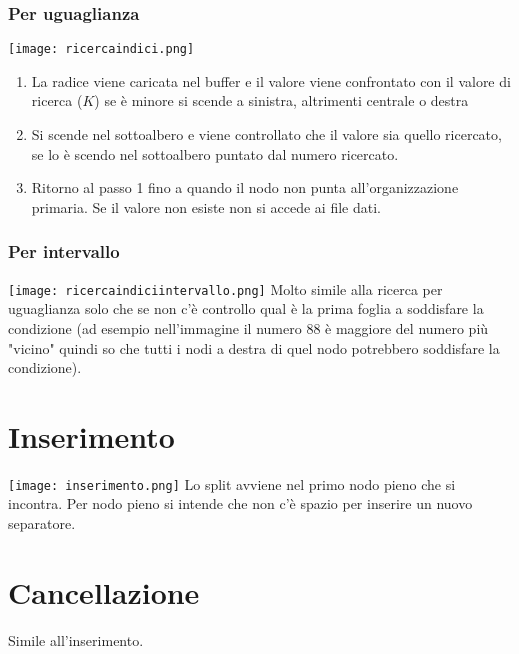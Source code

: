 \documentclass[12pt]{article}
\begin{document}
\subsubsection{Per uguaglianza}
\texttt{[image: ricercaindici.png]}
\begin{enumerate}
    \item La radice viene caricata nel buffer e il valore viene confrontato con il valore di ricerca ($K$) se è minore si scende a sinistra, altrimenti centrale o destra
    \item Si scende nel sottoalbero e viene controllato che il valore sia quello ricercato, se lo è scendo nel sottoalbero puntato dal numero ricercato.
    \item Ritorno al passo 1 fino a quando il nodo non punta all'organizzazione primaria. Se il valore non esiste non si accede ai file dati.
\end{enumerate}
\subsubsection{Per intervallo}
\texttt{[image: ricercaindiciintervallo.png]}
Molto simile alla ricerca per uguaglianza solo che se non c'è controllo qual è la prima foglia a soddisfare la condizione (ad esempio nell'immagine il numero 88 è maggiore del numero più "vicino" quindi so che tutti i nodi a destra di quel nodo potrebbero soddisfare la condizione).
\section{Inserimento}
\texttt{[image: inserimento.png]}
Lo split avviene nel primo nodo pieno che si incontra. Per nodo pieno si intende che non c'è spazio per inserire un nuovo separatore.
\section{Cancellazione}
Simile all'inserimento.
\end{document}
